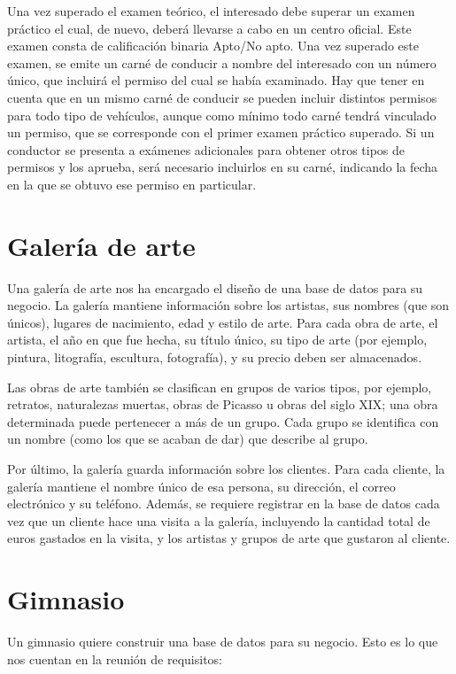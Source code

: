 \documentclass[a4paper]{article}
\begin{document}
Una vez superado el examen teórico, el interesado debe superar un examen práctico el cual, de nuevo, deberá llevarse a cabo en un centro oficial. Este examen consta de calificación binaria Apto/No apto. Una vez superado este examen, se emite un carné de conducir a nombre del interesado con un número único, que incluirá el permiso del cual se había examinado. Hay que tener en cuenta que en un mismo carné de conducir se pueden incluir distintos permisos para todo tipo de vehículos, aunque como mínimo todo carné tendrá vinculado un permiso, que se corresponde con el primer examen práctico superado. Si un conductor se presenta a exámenes adicionales para obtener otros tipos de permisos y los aprueba, será necesario incluirlos en su carné, indicando la fecha en la que se obtuvo ese permiso en particular.

\section{Galería de arte}
Una galería de arte nos ha encargado el diseño de una base de datos para su negocio. La galería mantiene información sobre los artistas, sus nombres (que son únicos), lugares de nacimiento, edad y estilo de arte. Para cada obra de arte, el artista, el año en que fue hecha, su título único, su tipo de arte (por ejemplo, pintura, litografía, escultura, fotografía), y su precio deben ser almacenados. 

Las obras de arte también se clasifican en grupos de varios tipos, por ejemplo, retratos, naturalezas muertas, obras de Picasso u obras del siglo XIX; una obra determinada puede pertenecer a más de un grupo. Cada grupo se identifica con un nombre (como los que se acaban de dar) que describe al grupo. 

Por último, la galería guarda información sobre los clientes. Para cada cliente, la galería mantiene el nombre único de esa persona, su dirección, el correo electrónico y su teléfono. Además, se requiere registrar en la base de datos cada vez que un cliente hace una visita a la galería, incluyendo la cantidad total de euros gastados en la visita, y los artistas y grupos de arte que gustaron al cliente.

\section{Gimnasio}
Un gimnasio quiere construir una base de datos para su negocio. Esto es lo que nos cuentan en la reunión de requisitos:
\end{document}
